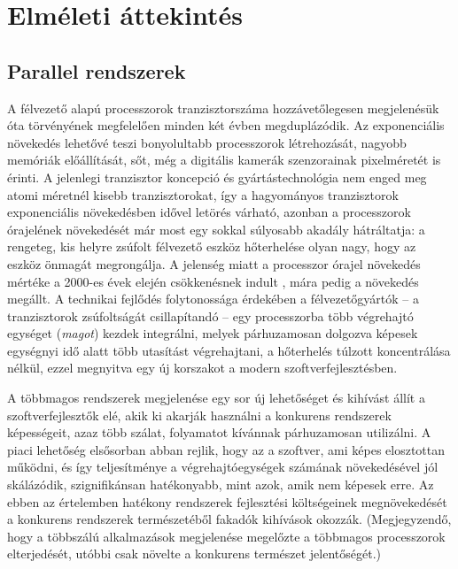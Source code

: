 \chapter{Elméleti áttekintés}

\section{Parallel rendszerek}

A félvezető alapú processzorok tranzisztorszáma hozzávetőlegesen megjelenésük óta \cite{Moore} törvényének megfelelően minden két évben megduplázódik. Az exponenciális növekedés lehetővé teszi bonyolultabb processzorok létrehozását, nagyobb memóriák előállítását, sőt, még a digitális kamerák szenzorainak pixelméretét is érinti. A jelenlegi tranzisztor koncepció és gyártástechnológia nem enged meg atomi méretnél kisebb tranzisztorokat, így a hagyományos tranzisztorok exponenciális növekedésben idővel letörés várható, azonban a processzorok órajelének növekedését már most egy sokkal súlyosabb akadály hátráltatja: a rengeteg, kis helyre zsúfolt félvezető eszköz hőterhelése olyan nagy, hogy az eszköz önmagát megrongálja. A jelenség miatt a processzor órajel növekedés mértéke a 2000-es évek elején csökkenésnek indult \cite{CMOS-VLSI}, mára pedig a növekedés megállt. A technikai fejlődés folytonossága érdekében a félvezetőgyártók -- a tranzisztorok zsúfoltságát csillapítandó -- egy processzorba több végrehajtó egységet (\emph{magot}) kezdek integrálni, melyek párhuzamosan dolgozva képesek egységnyi idő alatt több utasítást végrehajtani, a hőterhelés túlzott koncentrálása nélkül, ezzel megnyitva egy új korszakot a modern szoftverfejlesztésben.

    A többmagos rendszerek megjelenése egy sor új lehetőséget és kihívást állít a szoftverfejlesztők elé, akik ki akarják használni a konkurens rendszerek képességeit, azaz több szálat, folyamatot kívánnak párhuzamosan utilizálni. A piaci lehetőség elsősorban abban rejlik, hogy az a szoftver, ami képes elosztottan működni, és így teljesítménye a végrehajtóegységek számának növekedésével jól skálázódik, szignifikánsan hatékonyabb, mint azok, amik nem képesek erre. Az ebben az értelemben hatékony rendszerek fejlesztési költségeinek megnövekedését a konkurens rendszerek természetéből fakadók kihívások okozzák. (Megjegyzendő, hogy a többszálú alkalmazások megjelenése megelőzte a többmagos processzorok elterjedését, utóbbi csak növelte a konkurens természet jelentőségét.)
    
